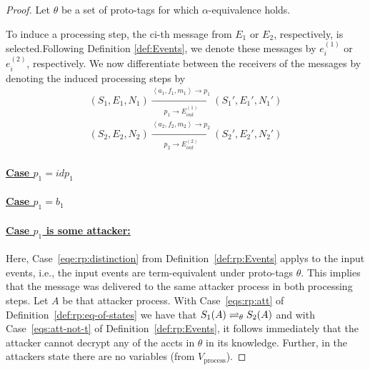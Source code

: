   \begin{proof}
    Let $\theta$ be a set of proto-tags for which 
    $\alpha$-equivalence holds.
    
    To induce a processing step, the ci-th message from $E_1$ or 
    $E_2$, respectively, is selected.Following Definition 
    \ref{def:Events}, we denote these messages by $e_i^{(1)}$ or 
    $e_i^{(2)}$, respectively. We now differentiate between the 
    receivers of the messages by denoting the induced processing 
    steps by
    \begin{equation}
      \begin{aligned}
        (S_1,E_1,N_1)\xrightarrow[p_1\rightarrow E_{out}^{(1)}]{\left \langle a_1,f_1,m_1\right \rangle\rightarrow p_1}(S_1\prime,E_1\prime,N_1\prime)\\
        (S_2,E_2,N_2)\xrightarrow[p_2\rightarrow E_{out}^{(2)}]{\left \langle a_2,f_2,m_2\right \rangle\rightarrow p_2}(S_2\prime,E_2\prime,N_2\prime)
      \end{aligned}
    \end{equation}
    \paragraph{\underline{Case $p_1 = idp_1$}}
  
    \paragraph{\underline{Case $p_1 = b_1$}}
  
    \paragraph{\underline{Case $p_1$ is some attacker:}}
    
    Here, Case~\ref{eqe:rp:distinction} from 
    Definition~\ref{def:rp:Events} applys to the input events,
    i.e., the input events are term-equivalent under proto-tags
    $\theta$. This implies that the message was delivered to the 
    same attacker process in both processing steps. Let $A$ be 
    that attacker process. With Case~\ref{eqs:rp:att} of 
    Definition~\ref{def:rp:eq-of-states} we have that 
    $S_1(A) \rightleftharpoons_{\theta} S_2(A)$ and with 
    Case~\ref{eqs:att-not-t} of Definition~\ref{def:rp:Events},  
    it follows immediately that the attacker cannot decrypt any 
    of the accts in $\theta$ in its knowledge. Further, in the 
    attackers state there are no variables (from $V_\text{process}$). 
  

\end{proof}
